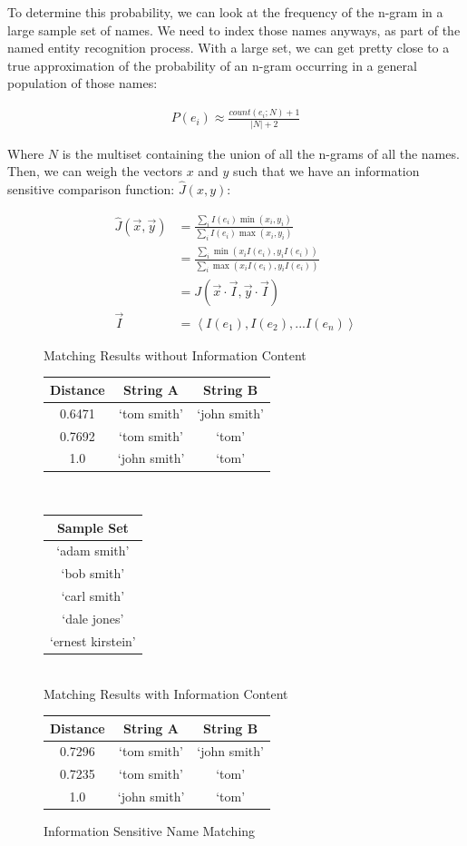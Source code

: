 \documentclass[11pt]{article}
\begin{document}
To determine this probability, we can look at the frequency
of the n-gram in a large sample set of names.
We need to index those names anyways, as part of the named entity
recognition process. With a large set, we can get pretty close to a true 
approximation of the probability of an n-gram occurring in 
a general population of those names:

\begin{align*}
P(e_i) \approx \frac{count(e_i; N)+1}{|N|+2}
\end{align*}

Where $N$ is the multiset containing the union of all the n-grams of
all the names. 
Then, we can weigh the vectors $x$ and $y$ such that we have
an information sensitive comparison function: $\hat{J}(x,y)$:

\begin{align*}
\hat{J}(\vec{x},\vec{y}) 
&= \frac{
    \sum_i I(e_i)\min(x_i, y_i)
}{
    \sum_i I(e_i)\max(x_i, y_i)
}\\
&= \frac{
    \sum_i \min(x_iI(e_i), y_iI(e_i))
}{
    \sum_i \max(x_iI(e_i), y_iI(e_i))
}\\
&= J\left(\vec{x} \cdot \vec{I}, \vec{y} \cdot \vec{I} \right)\\
\vec{I} &= \left< I(e_1), I(e_2), ... I(e_n) \right>
\end{align*}

\begin{figure}[h!]
    \centering
Matching Results without Information Content\\
\begin{tabular}{c|c|c}
  Distance & String A & String B \\
\hline
  0.6471 & `tom smith' & `john smith' \\
  0.7692 & `tom smith' & `tom' \\
  1.0 & `john smith' & `tom'
\end{tabular}
\\
\begin{tabular}{ c}
Sample Set\\
\hline
`adam smith' \\
`bob smith' \\
`carl smith' \\
`dale jones' \\
`ernest kirstein'
\end{tabular}
\\
Matching Results with Information Content\\
\begin{tabular}{c|c|c}
  Distance & String A & String B \\
\hline
  0.7296 & `tom smith' & `john smith' \\
  0.7235 & `tom smith' & `tom' \\
  1.0 & `john smith' & `tom'
\end{tabular}
\caption{Information Sensitive Name Matching}
\label{fig:lev_comp}
\end{figure}
\end{document}
